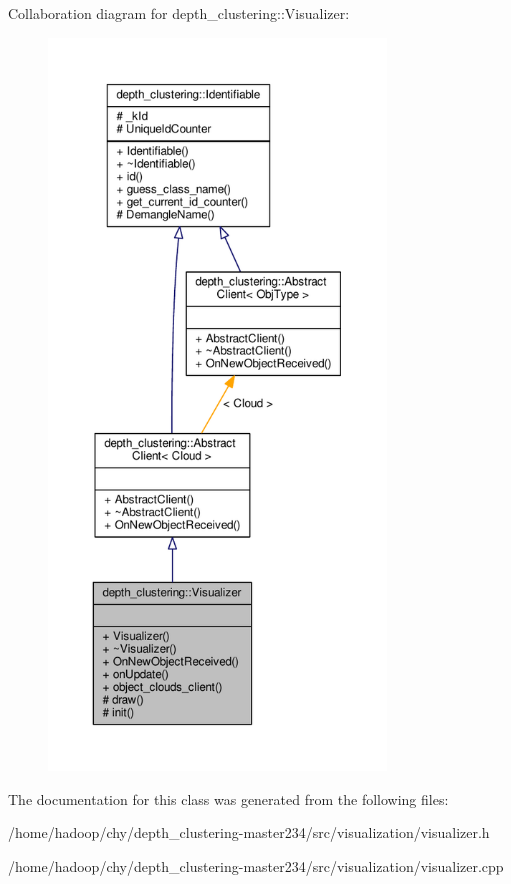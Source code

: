 Collaboration diagram for depth\-\_\-clustering\-:\-:Visualizer\-:
\nopagebreak
\begin{figure}[H]
\begin{center}
\leavevmode
\includegraphics[height=550pt]{classdepth__clustering_1_1Visualizer__coll__graph}
\end{center}
\end{figure}


The documentation for this class was generated from the following files\-:\begin{DoxyCompactItemize}
\item 
/home/hadoop/chy/depth\-\_\-clustering-\/master234/src/visualization/visualizer.\-h\item 
/home/hadoop/chy/depth\-\_\-clustering-\/master234/src/visualization/visualizer.\-cpp\end{DoxyCompactItemize}
